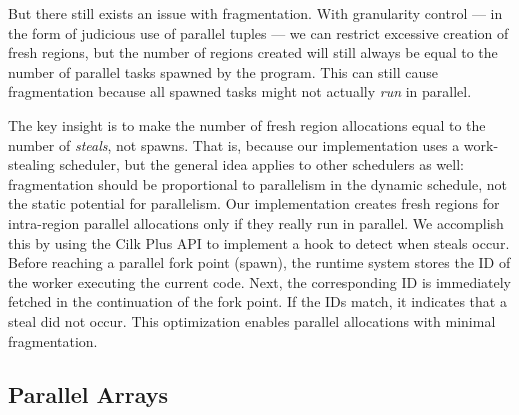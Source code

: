 \documentclass[acmsmall,acmthm=false,nonacm]{acmart}
\theoremstyle{straighttext0}
\theoremstyle{straighttext}
\newcommand{\new}[1]{#1}
\begin{document}
{%
%
But there still exists an issue with fragmentation.
%
With granularity control --- in the form of judicious use of parallel tuples ---
we can restrict excessive creation of fresh regions, but the number of regions created will still
always be equal to the number of parallel tasks spawned by the program.
%
This can still cause fragmentation because all spawned tasks
might not actually {\em run} in parallel.

The key insight
is to make the number of fresh region allocations equal to the number of
{\em steals}, not spawns.
%
That is, because our implementation uses a work-stealing scheduler,
but the general idea applies to other schedulers as well: fragmentation
should be proportional to parallelism in the dynamic schedule, not the static
potential for parallelism.
%
Our implementation creates fresh regions for intra-region parallel allocations
only if they really run in parallel.
%
We accomplish this by using the Cilk Plus API to implement a hook to detect when steals occur.
%
Before reaching a parallel fork point (spawn), the runtime system stores the ID of the worker
executing the current code.
%
Next, the corresponding ID is immediately fetched in the continuation of the fork point.
%
If the IDs match, it indicates that a steal did not occur.
%
This optimization enables parallel allocations with minimal fragmentation.


\subsection{Parallel Arrays}
\label{subsec:parallel-arrays}

}
\end{document}
